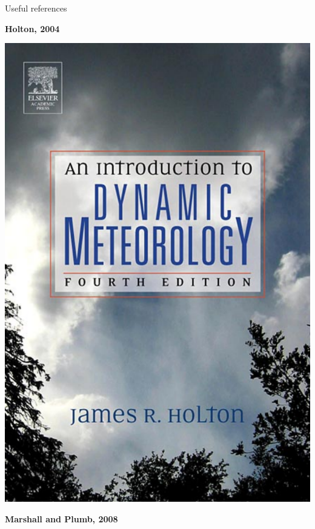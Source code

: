 \documentclass[aspectratio=169,xcolor=dvipsnames]{beamer}
\begin{document}
\begin{frame}{Useful references}

\begin{center}

\begin{minipage}{0.18\textwidth}
\begin{center}
\textbf{Holton, 2004}

\vspace{1em}

\includegraphics[width=1\textwidth]{figs/Fig-Book-Holton-2004.pdf}
\end{center}
\end{minipage}
\hspace{1em}
\begin{minipage}{0.18\textwidth}
\begin{center}
\textbf{Marshall and Plumb, 2008}


\end{center}
\end{minipage}
\end{center}
\end{frame}
\end{document}
